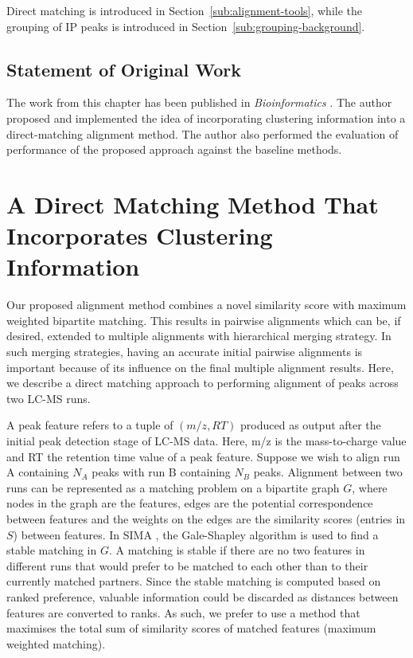 Direct matching is introduced in Section~\ref{sub:alignment-tools}, while the grouping of IP peaks is introduced in Section~\ref{sub:grouping-background}. 

\subsection*{Statement of Original Work}

The work from this chapter has been published in \textit{Bioinformatics} \cite{wandy2015incorporating}. The author proposed and implemented the idea of incorporating clustering information into a direct-matching alignment method. The author also performed the evaluation of performance of the proposed approach against the baseline methods. 

\section{A Direct Matching Method That Incorporates Clustering Information\label{sub:direct-matching}}

Our proposed alignment method combines a novel similarity score with maximum weighted bipartite matching. This results in pairwise alignments which can be, if desired, extended to multiple alignments with hierarchical merging strategy. In such merging strategies, having an accurate initial pairwise alignments is important because of its influence on the final multiple alignment results. Here, we describe a direct matching approach to performing alignment of peaks across two LC-MS runs. 

A peak feature refers to a tuple of $(m/z,RT)$ produced as output after the initial peak detection stage of LC-MS data. Here, m/z is the mass-to-charge value and RT the retention time value of a peak feature. Suppose we wish to align run A containing $N_A$ peaks with run B containing $N_B$ peaks.  Alignment between two runs can be represented as a matching problem on a bipartite graph $G$, where nodes in the graph are the features, edges are the potential correspondence between features and the weights on the edges are the similarity scores (entries in $S$) between features. In SIMA \cite{Voss2011a}, the Gale-Shapley algorithm \cite{Gusfield1989} is used to find a stable matching in $G$. A matching is stable if there are no two features in different runs that would prefer to be matched to each other than to their currently matched partners. Since the stable matching is computed based on ranked preference, valuable information could be discarded as distances between features are converted to ranks. As such, we prefer to use a method that maximises the total sum of similarity scores of matched features (maximum weighted matching).

